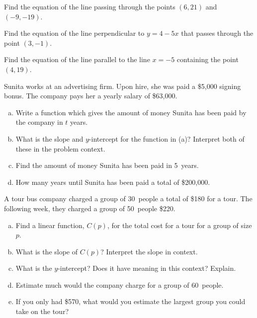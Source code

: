 \documentclass[11pt,letterpaper]{article}
\begin{document}
 Find the equation of the line passing through the points $(6, 21)$ and $(-9, -19)$. \pspace



\newpage



 Find the equation of the line perpendicular to $y= 4 - 5x$ that passes through the point $(3, -1)$. \pspace



\newpage



 Find the equation of the line parallel to the line $x= -5$ containing the point $(4, 19)$. \pspace



\newpage



 Sunita works at an advertising firm. Upon hire, she was paid a \$5,000 signing bonus. The company pays her a yearly salary of \$63,000. 
        \begin{enumerate}[(a)]
        \item Write a function which gives the amount of money Sunita has been paid by the company in $t$ years. 
        \item What is the slope and $y$-intercept for the function in (a)? Interpret both of these in the problem context. 
        \item Find the amount of money Sunita has been paid in 5~years.
        \item How many years until Sunita has been paid a total of \$200,000. 
        \end{enumerate}



\newpage



 A tour bus company charged a group of 30~people a total of \$180 for a tour. The following week, they charged a group of 50~people \$220.
        \begin{enumerate}[(a)]
        \item Find a linear function, $C(p)$, for the total cost for a tour for a group of size $p$. 
        \item What is the slope of $C(p)$? Interpret the slope in context. 
        \item What is the $y$-intercept? Does it have meaning in this context? Explain. 
        \item Estimate much would the company charge for a group of 60~people.
        \item If you only had \$570, what would you estimate the largest group you could take on the tour?
        \end{enumerate}
\end{document}
